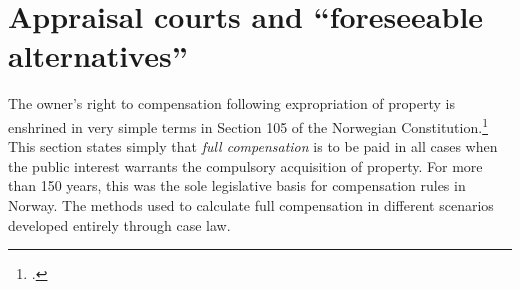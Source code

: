 %
%

\section{Appraisal courts and ``foreseeable alternatives''}

The owner's right to compensation following expropriation of property is enshrined in very simple terms in Section 105 of the Norwegian Constitution.\footnote{\cite[105]{grunnloven14}.} This section states simply that \emph{full compensation} is to be paid in all cases when the public interest warrants the compulsory acquisition of property. For more than 150 years, this was the sole legislative basis for compensation rules in Norway. The methods used to calculate full compensation in different scenarios developed entirely through case law.

